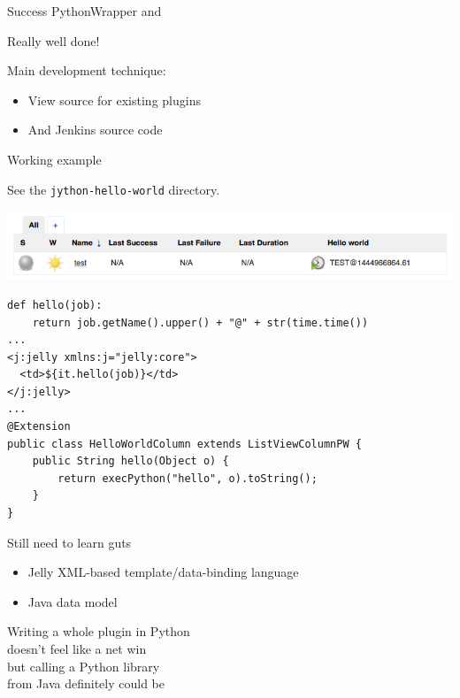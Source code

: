 \documentclass[xcolor=svgnames,17pt]{beamer}
\newcommand*{\sizefont}[1]{%
    \ifcase#1\relax
    \or \tiny
    \or \scriptsize
    \or \footnotesize
    \or \small
    \or \normalsize
    \or \large
    \or \Large
    \or \LARGE
    \or \huge
    \or \Huge
    \fi}
\begin{document}
\begin{frame}{Success}
PythonWrapper and
\href{https://github.com/jenkinsci/jenkins.py/tree/master/ppsm}{}

\vspace*{\baselineskip}

\pause

Really well done!

\vspace*{\baselineskip}

\pause

Main development technique:
\begin{itemize}
\item View source for existing plugins
\item And Jenkins source code
\end{itemize}
\end{frame}


\begin{frame}[fragile]{Working example}

See the \texttt{jython-hello-world} directory.

\includegraphics[width=\textwidth]{jython-hello-world.png}

\vspace*{-0.5\baselineskip}

{\sizefont{1}
\begin{verbatim}
def hello(job):
    return job.getName().upper() + "@" + str(time.time())
...
<j:jelly xmlns:j="jelly:core">
  <td>${it.hello(job)}</td>
</j:jelly>
...
@Extension
public class HelloWorldColumn extends ListViewColumnPW {
    public String hello(Object o) {
        return execPython("hello", o).toString();
    }
}
\end{verbatim}
}

\end{frame}

\begin{frame}{Still need to learn guts}
\begin{itemize}
\item Jelly XML-based template/data-binding language
\item Java data model
\end{itemize}
\pause

\begin{center}
Writing a whole plugin in Python \\ doesn’t feel like a net win \\
\pause
but calling a Python library \\ from Java definitely could be
\end{center}

\end{frame}
\end{document}
